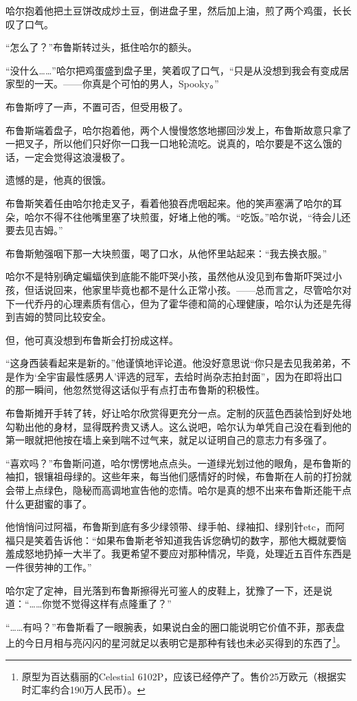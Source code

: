 \documentclass[../main]{subfiles}
\begin{document}
哈尔抱着他把土豆饼改成炒土豆，倒进盘子里，然后加上油，煎了两个鸡蛋，长长叹了口气。

“怎么了？”布鲁斯转过头，抵住哈尔的额头。

“没什么……”哈尔把鸡蛋盛到盘子里，笑着叹了口气，“只是从没想到我会有变成居家型的一天。——你真是个可怕的男人，Spooky。”

布鲁斯哼了一声，不置可否，但受用极了。

布鲁斯端着盘子，哈尔抱着他，两个人慢慢悠悠地挪回沙发上，布鲁斯故意只拿了一把叉子，所以他们只好你一口我一口地轮流吃。说真的，哈尔要是不这么饿的话，一定会觉得这浪漫极了。

遗憾的是，他真的很饿。

布鲁斯笑着任由哈尔抢走叉子，看着他狼吞虎咽起来。他的笑声塞满了哈尔的耳朵，哈尔不得不往他嘴里塞了块煎蛋，好堵上他的嘴。“吃饭。”哈尔说，“待会儿还要去见吉姆。”

布鲁斯勉强咽下那一大块煎蛋，喝了口水，从他怀里站起来：“我去换衣服。”

哈尔不是特别确定蝙蝠侠到底能不能吓哭小孩，虽然他从没见到布鲁斯吓哭过小孩，但话说回来，他家里毕竟也都不是什么正常小孩。——总而言之，尽管哈尔对下一代乔丹的心理素质有信心，但为了霍华德和简的心理健康，哈尔认为还是先得到吉姆的赞同比较安全。

但，他可真没想到布鲁斯会打扮成这样。

“这身西装看起来是新的。”他谨慎地评论道。他没好意思说“你只是去见我弟弟，不是作为‘全宇宙最性感男人’评选的冠军，去给时尚杂志拍封面”，因为在即将出口的那一瞬间，他忽然觉得这话似乎有点打击布鲁斯的积极性。

布鲁斯摊开手转了转，好让哈尔欣赏得更充分一点。定制的灰蓝色西装恰到好处地勾勒出他的身材，显得既矜贵又诱人。这么说吧，哈尔认为单凭自己没在看到他的第一眼就把他按在墙上亲到喘不过气来，就足以证明自己的意志力有多强了。

“喜欢吗？”布鲁斯问道，哈尔愣愣地点点头。一道绿光划过他的眼角，是布鲁斯的袖扣，银镶祖母绿的。这些年来，每当他们感情好的时候，布鲁斯在人前的打扮就会带上点绿色，隐秘而高调地宣告他的恋情。哈尔是真的想不出来布鲁斯还能干点什么更甜蜜的事了。

他悄悄问过阿福，布鲁斯到底有多少绿领带、绿手帕、绿袖扣、绿别针etc，而阿福只是笑着告诉他：“如果布鲁斯老爷知道我告诉您确切的数字，那他大概就要恼羞成怒地扔掉一大半了。我更希望不要应对那种情况，毕竟，处理近五百件东西是一件很劳神的工作。”

哈尔定了定神，目光落到布鲁斯擦得光可鉴人的皮鞋上，犹豫了一下，还是说道：“……你觉不觉得这样有点隆重了？”

“……有吗？”布鲁斯看了一眼腕表，如果说白金的圈口能说明它价值不菲，那表盘上的今日月相与亮闪闪的星河就足以表明它是那种有钱也未必买得到的东西了\footnote[1]{原型为百达翡丽的Celestial 6102P，应该已经停产了。售价25万欧元（根据实时汇率约合190万人民币）。}。
\end{document}
